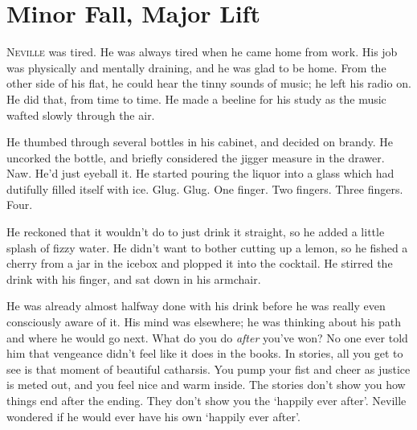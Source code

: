 \chapter{Minor Fall, Major Lift}


\lettrine{N}{eville} was tired. He was always tired when he came home from work. His job was physically and mentally draining, and he was glad to be home. From the other side of his flat, he could hear the tinny sounds of music; he left his radio on. He did that, from time to time. He made a beeline for his study as the music wafted slowly through the air.


He thumbed through several bottles in his cabinet, and decided on brandy. He uncorked the bottle, and briefly considered the jigger measure in the drawer. Naw. He’d just eyeball it. He started pouring the liquor into a glass which had dutifully filled itself with ice. Glug. Glug. One finger. Two fingers. Three fingers. Four.\SmallVSpace

He reckoned that it wouldn’t do to just drink it straight, so he added a little splash of fizzy water. He didn’t want to bother cutting up a lemon, so he fished a cherry from a jar in the icebox and plopped it into the cocktail. He stirred the drink with his finger, and sat down in his armchair.


He was already almost halfway done with his drink before he was really even consciously aware of it. His mind was elsewhere; he was thinking about his path and where he would go next. What do you do \textit{after} you’ve won?
\SmallVSpace
No one ever told him that vengeance didn’t feel like it does in the books. In stories, all you get to see is that moment of beautiful catharsis. You pump your fist and cheer as justice is meted out, and you feel nice and warm inside. The stories don’t show you how things end after the ending. They don’t show you the ‘happily ever after’. Neville wondered if he would ever have his own ‘happily ever after’.

